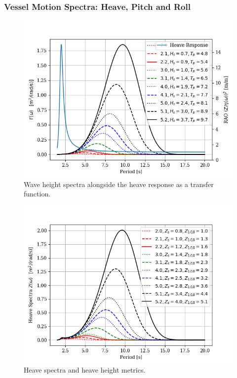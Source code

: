 \documentclass[11pt, letterpaper]{article}
\begin{document}
\subsubsection{Vessel Motion Spectra: Heave, Pitch and Roll}

\begin{figure}[hbt!]
\centering
\includegraphics[width=\RFW\linewidth]{cusv/SvsTwG.png}
\caption{Wave height spectra alongside the heave response as a transfer function.}
\label{f:SvsTwG}
\end{figure}

\begin{figure}[hbt!]
\centering
\includegraphics[width=\RFW\linewidth]{cusv/heaveresp.png}
\caption{Heave spectra and heave height metrics.}
\label{f:heaveresp}
\end{figure}
\end{document}
